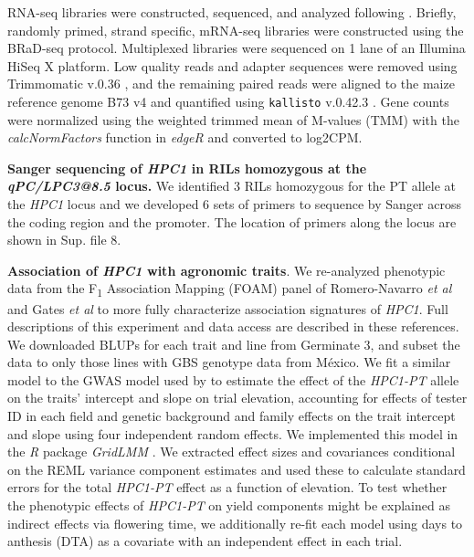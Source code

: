 \documentclass[9pt,twocolumn,twoside,lineno]{biorxiv}
\begin{document}
RNA-seq libraries were constructed, sequenced, and analyzed following \cite{Crow2020-gene}. 
Briefly, randomly primed, strand specific, mRNA-seq libraries were constructed using the BRaD-seq \cite{townsley2015brad} protocol.
Multiplexed libraries were sequenced on 1 lane of an Illumina HiSeq X platform. 
Low quality reads and adapter sequences were removed using Trimmomatic v.0.36 \cite{bolger2014trimmomatic}, and the remaining paired reads were aligned to the maize reference genome B73 v4 and quantified using \texttt{kallisto} v.0.42.3 \cite{bray2016near}. 
Gene counts were normalized using the weighted trimmed mean of M-values (TMM) with the \textit{calcNormFactors} function in \textit{edgeR} \cite{robinson2010edger} and converted to log2CPM.

\textbf{Sanger sequencing of \textit{HPC1} in RILs homozygous at the \textit{qPC/LPC3@8.5} locus.}
We identified 3 RILs homozygous for the PT allele at the \textit{HPC1} locus and we developed 6 sets of primers to sequence by Sanger across the coding region and the promoter. 
The location of primers along the locus are shown in Sup. file 8. 

\textbf{Association of \textit{HPC1} with agronomic traits}.
We re-analyzed phenotypic data from the F\textsubscript{1} Association Mapping (FOAM) panel of Romero-Navarro \textit{et al} \cite{Romero_Navarro2017-cn} and Gates \textit{et al} \cite{Gates2019-xu} to more fully characterize association signatures of \textit{HPC1}. 
Full descriptions of this experiment and data access are described in these references. 
We downloaded BLUPs for each trait and line from Germinate 3, and subset the data to only those lines with GBS genotype data from México. 
We fit a similar model to the GWAS model used by \cite{Gates2019-xu} to estimate the effect of the \textit{HPC1-PT} allele on the traits' intercept and slope on trial elevation, accounting for effects of tester ID in each field and genetic background and family effects on the trait intercept and slope using four independent random effects. 
We implemented this model in the \textit{R} package \textit{GridLMM} \cite{Runcie2019-Gr}. 
We extracted effect sizes and covariances conditional on the REML variance component estimates and used these to calculate standard errors for the total \textit{HPC1-PT} effect as a function of elevation. 
To test whether the phenotypic effects of \textit{HPC1-PT} on yield components might be explained as indirect effects via flowering time, we additionally re-fit each model using days to anthesis (DTA) as a covariate with an independent effect in each trial.
\end{document}
